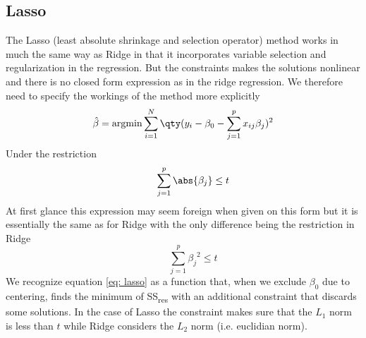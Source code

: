 \subsection{Lasso}
The Lasso (least absolute shrinkage and selection operator) method works in much the same way as Ridge in that it incorporates variable selection and regularization in the regression. But the constraints makes the solutions nonlinear and there is no closed form expression as in the ridge regression.\cite{hastie} We therefore need to specify the workings of the method more explicitly
\begin{equation}\label{eq: lasso}
	\hat{\beta} = \mathrm{argmin}\sum_{i=1}^N\qty( y_i - \beta_0 - \sum_{j=1}^p x_{ij}\beta_j )^2
\end{equation}
Under the restriction
\begin{equation}\label{eq: lasso restriction}
	\qquad \sum_{j=1}^p\abs{\beta_j}\leq t
\end{equation}
At first glance this expression may seem foreign when given on this form but it is essentially the same as for Ridge with the only difference being the restriction in Ridge
\begin{equation}\label{eq: ridge restriction}
	\qquad \sum_{j=1}^p{\beta_j}^2\leq t
\end{equation}
We recognize equation \ref{eq: lasso} as a function that, when we exclude $\beta_0$ due to centering, finds the minimum of SS\textsubscript{res} with an additional constraint that discards some solutions. In the case of Lasso the constraint makes sure that the $L_1$ norm is less than $t$ while Ridge considers the $L_2$ norm (i.e. euclidian norm).


